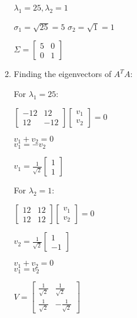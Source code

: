 \documentclass{article}%
\begin{document}
\begin{enumerate}
\begin{enumerate}
        $\lambda_1 = 25, \lambda_2 = 1$

        $\sigma_1 = \sqrt{25} = 5$
        $\sigma_2 = \sqrt{1} = 1$

        $\Sigma = \begin{bmatrix}
            5 & 0\\
            0 & 1 \end{bmatrix}$

        \item Finding the eigenvectors of $A^TA$:

        For $\lambda_1 = 25$:

        $\begin{bmatrix}
            -12 & 12\\
            12 & -12
        \end{bmatrix} \begin{bmatrix}
            v_1\\
            v_2
        \end{bmatrix} = 0$

        $v_1 + v_2 = 0$\\
        $v_1 = -v_2$

        $v_1 = \frac{1}{\sqrt{2}}\begin{bmatrix}
            1\\
            1 \end{bmatrix}$

        For $\lambda_2 = 1$:

        $\begin{bmatrix}
            12 & 12\\
            12 & 12
        \end{bmatrix} \begin{bmatrix}
            v_1\\
            v_2
        \end{bmatrix} = 0$

        $v_2 = \frac{1}{\sqrt{2}}\begin{bmatrix}
            1\\
            -1 \end{bmatrix}$

        $v_1 + v_2 = 0$\\
        $v_1 = v_2$

        $V = \begin{bmatrix}
            \frac{1}{\sqrt{2}} & \frac{1}{\sqrt{2}} \\
            \frac{1}{\sqrt{2}} & -\frac{1}{\sqrt{2}}
        \end{bmatrix}$


\end{enumerate}
\end{enumerate}
\end{document}
